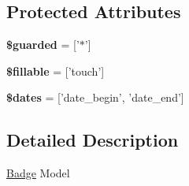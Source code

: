 \subsection*{Protected Attributes}
\begin{DoxyCompactItemize}
\item 
\hypertarget{classDMA_1_1Friends_1_1Models_1_1Badge_ae0b360f20ce06a26af28c91de3f63e11}{{\bfseries \$guarded} = \mbox{[}'$\ast$'\mbox{]}}\label{classDMA_1_1Friends_1_1Models_1_1Badge_ae0b360f20ce06a26af28c91de3f63e11}

\item 
\hypertarget{classDMA_1_1Friends_1_1Models_1_1Badge_a4d4f326e6071e6d44fdb54d93d579c44}{{\bfseries \$fillable} = \mbox{[}'touch'\mbox{]}}\label{classDMA_1_1Friends_1_1Models_1_1Badge_a4d4f326e6071e6d44fdb54d93d579c44}

\item 
\hypertarget{classDMA_1_1Friends_1_1Models_1_1Badge_ae8aa2206bbd9a6e152db7691a0dfd0b5}{{\bfseries \$dates} = \mbox{[}'date\-\_\-begin', 'date\-\_\-end'\mbox{]}}\label{classDMA_1_1Friends_1_1Models_1_1Badge_ae8aa2206bbd9a6e152db7691a0dfd0b5}

\end{DoxyCompactItemize}


\subsection{Detailed Description}
\hyperlink{classDMA_1_1Friends_1_1Models_1_1Badge}{Badge} Model 

